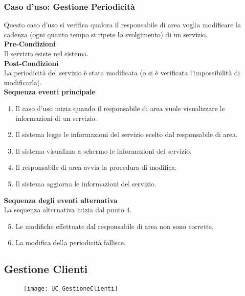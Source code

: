 \documentclass[green, fancy, 11pt]{elegantbook}
\begin{document}
\subsubsection{Caso d'uso: Gestione Periodicità}
Questo caso d’uso si verifica qualora il responsabile di area voglia modificare la cadenza (ogni quanto tempo si ripete lo svolgimento) di un servizio.\\
\textbf{Pre-Condizioni}\\
Il servizio esiste nel sistema.\\
\textbf{Post-Condizioni}\\
La periodicità del servizio è stata modificata (o si è verificata l’impossibilità di modificarla).\\
\textbf{Sequenza eventi principale}
\begin{enumerate}
	\item Il caso d’uso inizia quando il responsabile di area vuole visualizzare le informazioni di un servizio.
	\item Il sistema legge le informazioni del servizio scelto dal responsabile di area.
	\item Il sistema visualizza a schermo le informazioni del servizio.
	\item Il responsabile di area avvia la procedura di modifica.
	\item Il sistema aggiorna le informazioni del servizio.
\end{enumerate}
\textbf{Sequenza degli eventi alternativa}\\
La sequenza alternativa inizia dal punto 4.
\begin{enumerate}
	\setcounter{enumi}{4}
	\item Le modifiche effettuate dal responsabile di area non sono corrette.
	\item La modifica della periodicità fallisce.
\end{enumerate}
\newpage

\subsection{Gestione Clienti}
\begin{figure}[H]
	\texttt{[image: UC\_GestioneClienti]}
\end{figure}
\end{document}
